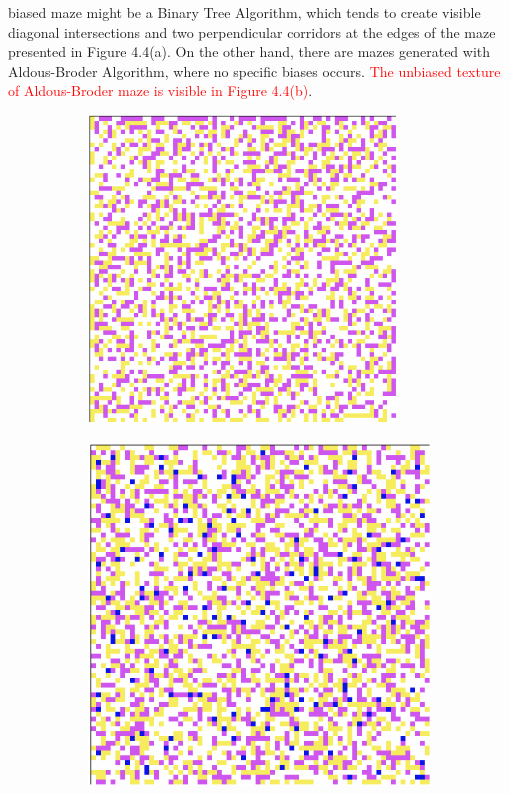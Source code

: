 biased maze might be a Binary Tree Algorithm, which tends to create visible diagonal intersections and two perpendicular corridors
at the edges of the maze presented in Figure 4.4(a). On the other hand, there are mazes generated with Aldous-Broder Algorithm, where no specific biases
occurs. \textcolor{red}{The unbiased texture of Aldous-Broder maze is visible in Figure 4.4(b)}.
\newline
\begin{figure}[!h]
    \centering
    \begin{subfigure}{.4\textwidth}
    \centering
    \includegraphics[width=0.9\textwidth]{binarydegree.png}
    \caption{}
    \end{subfigure}%
    \begin{subfigure}{0.4\textwidth}
    \centering
    \includegraphics[width=0.9\linewidth]{aldousdegree.png}

\end{subfigure}
\end{figure}
